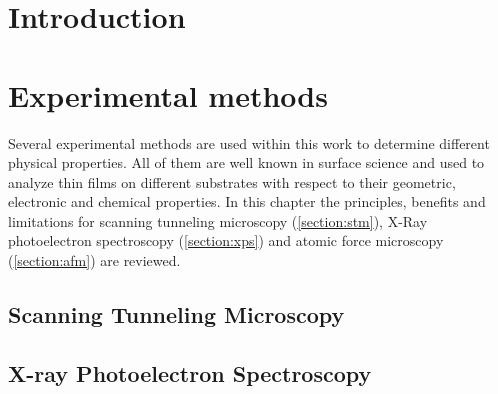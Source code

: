 \documentclass[
twoside,				%
BCOR=12mm,				%
headings=normal,		%
headsepline,			%
footsepline,			%
plainfootsepline,		%
]
{scrbook}
\begin{document}

 \frontmatter{}			 														%
 \setcounter{tocdepth}{5}														%
	\tableofcontents{}														 	%
%
\mainmatter{}
\chapter{Introduction}


\chapter{Experimental methods}
Several experimental methods are used within this work to determine different physical properties. All of them are well known in surface science and used to analyze thin films on different substrates with respect to their geometric, electronic and chemical properties.
In this chapter the principles, benefits and limitations for scanning tunneling microscopy (\autoref{section:stm}), X-Ray photoelectron spectroscopy (\autoref{section:xps}) and atomic force microscopy (\autoref{section:afm}) are reviewed. 

  \section{\textbf{S}canning \textbf{T}unneling \textbf{M}icroscopy}
  \label{section:stm}
    
  \section{\textbf{X}-ray \textbf{P}hotoelectron \textbf{S}pectroscopy}
  \label{section:xps}
	
\end{document}
